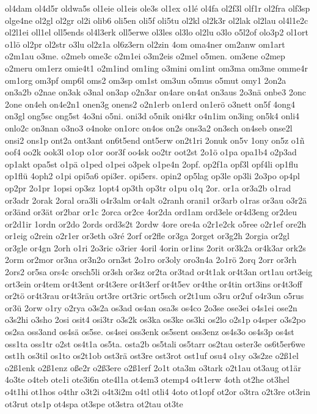 {ol4dam
ol4d5r
oldwa5s
ol1eie
ol1eis
ole3s
ol1ex
o1lé
ol4fa
ol2f3l
olf1r
ol2fra
olf3sp
olge4ne
ol2gl
ol2gr
ol2i
olib6
oli5en
oli5f
oli5tu
ol2kl
ol2k3r
ol2lak
ol2lau
ol4l1e2c
ol2l1ei
oll1el
oll5ends
ol4l3erk
oll5erwe
ol3les
ol3lo
ol2lu
o3lo
o5l2of
olo3p2
ol1ort
o1lö
ol2pr
ol2str
o3lu
ol2z1a
ol6z3ern
ol2zin
4om
oma4ner
om2anw
om1art
o2m1au
o3me.
o2meb
ome3c
o2m1ei
o3m2eis
o2mel
o5men.
om3ene
o2mep
o2meru
om1erz
omie4t1
o2m1ind
om1ing
o3mini
om1int
om3ma
om3me
omme4r
om1org
om3pf
omp6l
oms2
om3sp
om1st
om3un
o5mus
o5mut
omy1
2on2a
on3a2b
o2nae
on3ak
o3nal
on3ap
o2n3ar
on4are
on4at
on3aus
2o3nä
onbe3
2onc
2one
on4eh
on4e2n1
onen3g
onens2
o2n1erb
on1erd
on1erö
o3nett
on5f
4ong4
on3gl
ong5sc
ong5st
4o3ni
o5ni.
oni3d
o5nik
oni4kr
o4n1im
on3ing
on5k4
onli4
onlo2c
on3nan
o3no3
o4noke
on1orc
on4os
on2s
ons3a2
on3sch
on4seb
onse2l
onsi2
ons1p
ont2a
ont3ant
on6t5end
ont5erw
on2t1ri
2onuk
on5v
1ony
on5z
o1ñ
oof4
oo2k
ook3l
o1op
o1or
oor3f
oo4sk
oo2tr
oot2st
2o1ö
o1pa
opa1b4
o2p3ad
op1akt
opa5st
o1pä
o1ped
o1pei
o3pek
o1pe4n
2opf.
op2f1a
opf3l
opf4li
op1flu
op1flü
4oph2
o1pi
opi5a6
opi3er.
opi5ers.
opin2
op5lag
op3le
op3li
2o3po
op4pl
op2pr
2o1pr
1opsi
op3sz
1opt4
op3th
op3tr
o1pu
o1q
2or.
or1a
or3a2b
o1rad
or3adr
2orak
2oral
ora3li
o4r3alm
or4alt
o2ranh
orani1
or3arb
o1ras
or3au
o3r2ä
or3änd
or3ät
or2bar
or1c
2orca
or2ce
4or2da
ord1am
ord3ele
or4d3eng
or2deu
or2d1ir
1ordn
or2do
2ords
ord3s2t
2ordw
4ore
ore4a
o2r1e2ck
o5ree
o2r1ef
ore2h
or1eig
o2rein
o2r1er
or3eth
o3ré
2orf
or2fle
or3ga
2orget
or3g2h
2orgia
or2gl
or3gle
or4gn
2orh
o1ri
2o3ric
o3rier
4oril
4orin
or1ins
2orit
or3k2a
or4k3ar
ork2s
2orm
or2mor
or3na
or3n2o
orn3st
2o1ro
or3oly
oro3n4a
2o1rö
2orq
2orr
or3rh
2ors2
or5sa
ors4c
orsch5li
or3sh
or3sz
or2ta
or3tad
or4t1ak
or4t3an
ort1au
ort3eig
ort3ein
or4tem
or4t3ent
or4t3ere
or4t3erf
or4t5ev
or4the
or4tin
ort3ins
or4t3off
or2tö
or4t3rau
or4t3räu
ort3re
ort3ric
ort5sch
or2t1um
o3ru
or2uf
o4r3un
o5rus
or3ü
2orw
o1ry
o2rya
o3s2a
os3ad
os4an
osa3s
os4co
2o3se
ose3ei
o4s1ei
ose2n
o3s2hi
o3sho
2osi
osit4
osi3tr
o3s2k
os3ka
os3ke
os3ki
os2lo
o2s1p
o4sper
o3s2po
os2sa
oss3and
os4sä
os5se.
os4sei
oss3enk
os5sent
oss3enz
os4s3o
os4s3p
os4st
oss1ta
oss1tr
o2st
os4t1a
os5ta.
osta2b
os5tali
os5tarr
os2tau
oster3e
os6t5er6we
ost1h
os3til
os1to
os2t1ob
ost3rä
ost3re
ost3rot
ost1uf
osu4
o1sy
o3s2ze
o2ß1el
o2ß1enk
o2ß1enz
oße2r
o2ß3ere
o2ß1erf
2o1t
ota3m
o3tark
o2t1au
ot3aug
ot1är
4o3te
o4teb
ote1i
ote3i6n
ote4l1a
ot4em3
otemp4
o4t1erw
4oth
ot2he
ot3hel
o4t1hi
ot1hos
o4thr
o3t2i
o4t3i2m
o4tl
otli4
4oto
ot1opf
ot2or
o3tra
o2t3re
ot3rin
ot3rut
ots1p
ot4spa
ot3spe
ot3stra
ot2tau
ot3te
}

